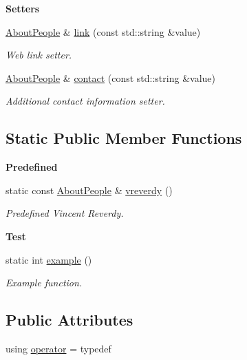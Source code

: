 \begin{Indent}{\bf Setters}
\begin{DoxyCompactItemize}
\hyperlink{exceptionmagrathea_1_1AboutPeople}{About\-People} \& \hyperlink{exceptionmagrathea_1_1AboutPeople_a7dd1fc439ec08bbb7d598ca8b2cc8611}{link} (const std\-::string \&value)
\begin{DoxyCompactList}\small\item\em Web link setter. \end{DoxyCompactList}\item 
\hyperlink{exceptionmagrathea_1_1AboutPeople}{About\-People} \& \hyperlink{exceptionmagrathea_1_1AboutPeople_a29244ace0a193d1213fc85121e484702}{contact} (const std\-::string \&value)
\begin{DoxyCompactList}\small\item\em Additional contact information setter. \end{DoxyCompactList}\end{DoxyCompactItemize}
\end{Indent}
\subsection*{Static Public Member Functions}
\begin{Indent}{\bf Predefined}\par
\begin{DoxyCompactItemize}
\item 
static const \hyperlink{exceptionmagrathea_1_1AboutPeople}{About\-People} \& \hyperlink{exceptionmagrathea_1_1AboutPeople_a9dc4d081ab78e6db12ede0c298def073}{vreverdy} ()
\begin{DoxyCompactList}\small\item\em Predefined Vincent Reverdy. \end{DoxyCompactList}\end{DoxyCompactItemize}
\end{Indent}
\begin{Indent}{\bf Test}\par
\begin{DoxyCompactItemize}
\item 
static int \hyperlink{exceptionmagrathea_1_1AboutPeople_a5a0977fb507ec22d7040b4b5450bb9a8}{example} ()
\begin{DoxyCompactList}\small\item\em Example function. \end{DoxyCompactList}\end{DoxyCompactItemize}
\end{Indent}
\subsection*{Public Attributes}
\begin{DoxyCompactItemize}
\item 
using \hyperlink{exceptionmagrathea_1_1AboutPeople_a109fe9feab9b5166eb06c5953a098d5a}{operator} = typedef
\end{DoxyCompactItemize}
